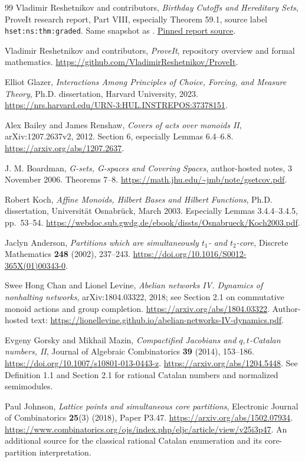 \documentclass[11pt,letterpaper]{article}
\numberwithin{equation}{section}
\theoremstyle{plain}
\theoremstyle{definition}
\theoremstyle{remark}
\begin{document}
\begin{thebibliography}{99}
Vladimir Reshetnikov and contributors,
\emph{Birthday Cutoffs and Hereditary Sets}, ProveIt research report,
Part VIII, especially Theorem 59.1, source label
\texttt{hset:ns:thm:graded}. Same snapshot as \cite{RepoNamingIII}.
\href{https://github.com/VladimirReshetnikov/ProveIt/blob/715a716a3002b1e9f28daa2d81c009a392851b94/Algebra/SurrealNumbers/docs/foundations-and-computation/birthday-cutoffs-and-hereditary-sets/article.tex}{Pinned report source}.

Vladimir Reshetnikov and contributors,
\emph{ProveIt}, repository overview and formal mathematics.
\url{https://github.com/VladimirReshetnikov/ProveIt}.

Elliot Glazer,
\emph{Interactions Among Principles of Choice, Forcing, and Measure Theory},
Ph.D. dissertation, Harvard University, 2023.
\url{https://nrs.harvard.edu/URN-3:HUL.INSTREPOS:37378151}.

Alex Bailey and James Renshaw,
\emph{Covers of acts over monoids II},
arXiv:1207.2637v2, 2012. Section 6, especially Lemmas 6.4--6.8.
\url{https://arxiv.org/abs/1207.2637}.

J. M. Boardman,
\emph{G-sets, G-spaces and Covering Spaces},
author-hosted notes, 3 November 2006. Theorems 7--8.
\url{https://math.jhu.edu/~jmb/note/gsetcov.pdf}.

Robert Koch,
\emph{Affine Monoids, Hilbert Bases and Hilbert Functions},
Ph.D. dissertation, Universit\"at Osnabr\"uck, March 2003.
Especially Lemmas 3.4.4--3.4.5, pp.~53--54.
\url{https://webdoc.sub.gwdg.de/ebook/dissts/Osnabrueck/Koch2003.pdf}.

Jaclyn Anderson,
\emph{Partitions which are simultaneously $t_1$- and $t_2$-core},
Discrete Mathematics \textbf{248} (2002), 237--243.
\url{https://doi.org/10.1016/S0012-365X(01)00343-0}.

Swee Hong Chan and Lionel Levine,
\emph{Abelian networks IV. Dynamics of nonhalting networks},
arXiv:1804.03322, 2018; see Section 2.1 on
commutative monoid actions and group completion.
\url{https://arxiv.org/abs/1804.03322}.
Author-hosted text:
\url{https://lionellevine.github.io/abelian-networks-IV-dynamics.pdf}.

Evgeny Gorsky and Mikhail Mazin,
\emph{Compactified Jacobians and $q,t$-Catalan numbers, II},
Journal of Algebraic Combinatorics \textbf{39} (2014),
153--186.
\url{https://doi.org/10.1007/s10801-013-0443-z}.
\url{https://arxiv.org/abs/1204.5448}.
See Definition 1.1 and Section 2.1 for rational
Catalan numbers and normalized semimodules.

Paul Johnson,
\emph{Lattice points and simultaneous core partitions},
Electronic Journal of Combinatorics \textbf{25}(3)
(2018), Paper P3.47.
\url{https://arxiv.org/abs/1502.07934}.
\url{https://www.combinatorics.org/ojs/index.php/eljc/article/view/v25i3p47}.
An additional source for the classical rational
Catalan enumeration and its core-partition interpretation.
\end{thebibliography}
\end{document}
